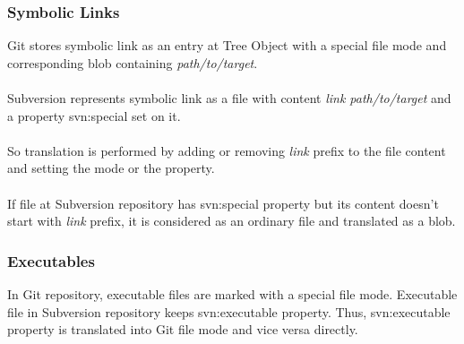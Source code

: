 \subsubsection{Symbolic Links}
Git stores symbolic link as an entry at Tree Object with a special file mode and corresponding blob containing \emph{path/to/target}.
\\\\
Subversion represents symbolic link as a file with content \emph{link path/to/target} and a property svn:special set on it.
\\\\
So translation is performed by adding or removing \emph{link } prefix to the file content and setting the mode or the property.
\\\\
If file at Subversion repository has svn:special property but its content doesn't start with \emph{link } prefix, it is considered as an ordinary file and translated as a blob.

\subsubsection{Executables}
In Git repository, executable files are marked with a special file mode. Executable file in Subversion repository keeps svn:executable property. 
Thus, svn:executable property is translated into Git file mode and vice versa directly.

